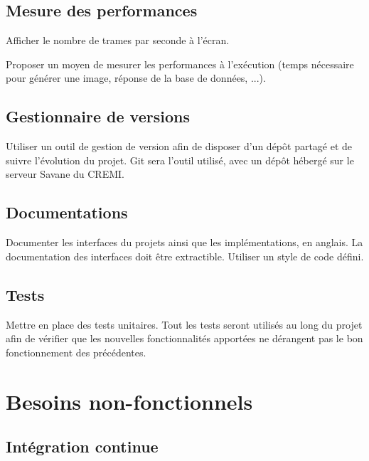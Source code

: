 \documentclass[12pt]{report}
\begin{document}
\subsection{Mesure des performances}

Afficher le nombre de trames par seconde à l'écran.

Proposer un moyen de mesurer les performances à l’exécution (temps nécessaire pour générer une image, réponse de la base de données, ...).


\subsection{Gestionnaire de versions }
Utiliser un outil de gestion de version afin de disposer d'un dépôt partagé et de suivre l'évolution du projet. Git sera l'outil utilisé, avec un dépôt hébergé sur le serveur Savane du CREMI.

\subsection{Documentations}

Documenter les interfaces du projets ainsi que les implémentations, en anglais. La documentation des interfaces doit être extractible.
Utiliser un style de code défini.


\subsection{Tests}

Mettre en place des tests unitaires. Tout les tests  seront utilisés au long du projet afin de vérifier que les nouvelles fonctionnalités apportées ne dérangent pas le bon fonctionnement des précédentes.


\newpage

\section{Besoins non-fonctionnels}
\subsection{Intégration continue}
\end{document}
